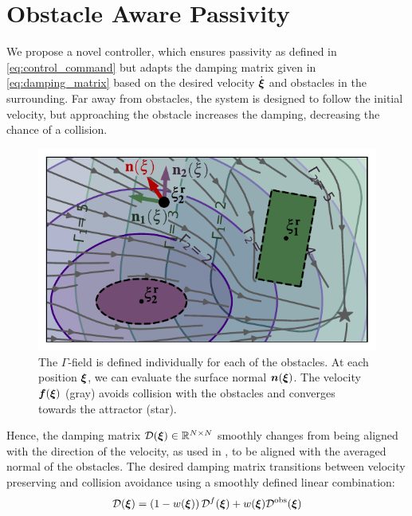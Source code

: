 \section{Obstacle Aware Passivity} \label{sec:obstacle_aware_passivity}
We propose a novel controller, which ensures passivity as defined in \eqref{eq:control_command} but adapts the damping matrix given in \eqref{eq:damping_matrix} based on the desired velocity $\dot{\boldsymbol{\xi}}$ and obstacles in the surrounding. 
Far away from obstacles, the system is designed to follow the initial velocity, but approaching the obstacle increases the damping, decreasing the chance of a collision.

\ifthesis
\begin{figure}
\centerline{\includegraphics[width=0.7\columnwidth]{figures/normal_and_gamma_field_visualization_annotated.pdf}}
\caption{
The $\Gamma$-field is defined individually for each of the obstacles. At each position $\boldsymbol{\xi}$, we can evaluate the surface normal $\boldsymbol{n}(\boldsymbol{\xi})$. 
The velocity $\boldsymbol{f}(\boldsymbol{\xi})$ (gray) avoids collision with the obstacles and converges towards the attractor (star).}
\label{fig:resultant_normal}
\end{figure}
\fi


Hence, the damping matrix $\mathcal{D}(\boldsymbol{\xi}) \in \mathbb{R}^{N \times N}$ smoothly changes from being aligned with the direction of the velocity, as used in \parencite{kronander2015passive}, to be aligned with the averaged normal of the obstacles. The desired damping matrix transitions between velocity preserving and collision avoidance using a smoothly defined linear combination:
\begin{equation}
    \matd D(\vecs\xi) = \left(1 - w(\vecs\xi) \right) {\matd D^{f}}(\vecs\xi) + w(\vecs\xi)  {\matd D^{\mathrm{obs}}}(\vecs\xi) \label{eq:damping_summation}
\end{equation}

